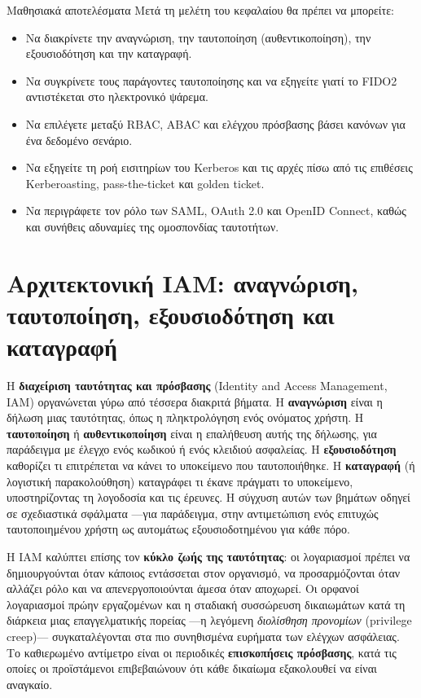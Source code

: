 \documentclass[11pt,openany]{book}
\begin{document}
\begin{outcomesbox}{Μαθησιακά αποτελέσματα}
Μετά τη μελέτη του κεφαλαίου θα πρέπει να μπορείτε:
\begin{itemize}
  \item Να διακρίνετε την αναγνώριση, την ταυτοποίηση (αυθεντικοποίηση), την εξουσιοδότηση και την καταγραφή.
  \item Να συγκρίνετε τους παράγοντες ταυτοποίησης και να εξηγείτε γιατί το FIDO2 αντιστέκεται στο ηλεκτρονικό ψάρεμα.
  \item Να επιλέγετε μεταξύ RBAC, ABAC και ελέγχου πρόσβασης βάσει κανόνων για ένα δεδομένο σενάριο.
  \item Να εξηγείτε τη ροή εισιτηρίων του Kerberos και τις αρχές πίσω από τις επιθέσεις Kerberoasting, pass-the-ticket και golden ticket.
  \item Να περιγράφετε τον ρόλο των SAML, OAuth 2.0 και OpenID Connect, καθώς και συνήθεις αδυναμίες της ομοσπονδίας ταυτοτήτων.
\end{itemize}
\end{outcomesbox}

\section{Αρχιτεκτονική IAM: αναγνώριση, ταυτοποίηση, εξουσιοδότηση και καταγραφή}\label{sec:8.1}
Η \textbf{διαχείριση ταυτότητας και πρόσβασης} (Identity and Access Management, IAM) οργανώνεται γύρω από τέσσερα διακριτά βήματα. Η \textbf{αναγνώριση} είναι η δήλωση μιας ταυτότητας, όπως η πληκτρολόγηση ενός ονόματος χρήστη. Η \textbf{ταυτοποίηση} ή \textbf{αυθεντικοποίηση} είναι η επαλήθευση αυτής της δήλωσης, για παράδειγμα με έλεγχο ενός κωδικού ή ενός κλειδιού ασφαλείας. Η \textbf{εξουσιοδότηση} καθορίζει τι επιτρέπεται να κάνει το υποκείμενο που ταυτοποιήθηκε. Η \textbf{καταγραφή} (ή λογιστική παρακολούθηση) καταγράφει τι έκανε πράγματι το υποκείμενο, υποστηρίζοντας τη λογοδοσία και τις έρευνες. Η σύγχυση αυτών των βημάτων οδηγεί σε σχεδιαστικά σφάλματα —για παράδειγμα, στην αντιμετώπιση ενός επιτυχώς ταυτοποιημένου χρήστη ως αυτομάτως εξουσιοδοτημένου για κάθε πόρο.

Η IAM καλύπτει επίσης τον \textbf{κύκλο ζωής της ταυτότητας}: οι λογαριασμοί πρέπει να δημιουργούνται όταν κάποιος εντάσσεται στον οργανισμό, να προσαρμόζονται όταν αλλάζει ρόλο και να απενεργοποιούνται άμεσα όταν αποχωρεί. Οι ορφανοί λογαριασμοί πρώην εργαζομένων και η σταδιακή συσσώρευση δικαιωμάτων κατά τη διάρκεια μιας επαγγελματικής πορείας —η λεγόμενη \emph{διολίσθηση προνομίων} (privilege creep)— συγκαταλέγονται στα πιο συνηθισμένα ευρήματα των ελέγχων ασφάλειας. Το καθιερωμένο αντίμετρο είναι οι περιοδικές \textbf{επισκοπήσεις πρόσβασης}, κατά τις οποίες οι προϊστάμενοι επιβεβαιώνουν ότι κάθε δικαίωμα εξακολουθεί να είναι αναγκαίο.
\end{document}
